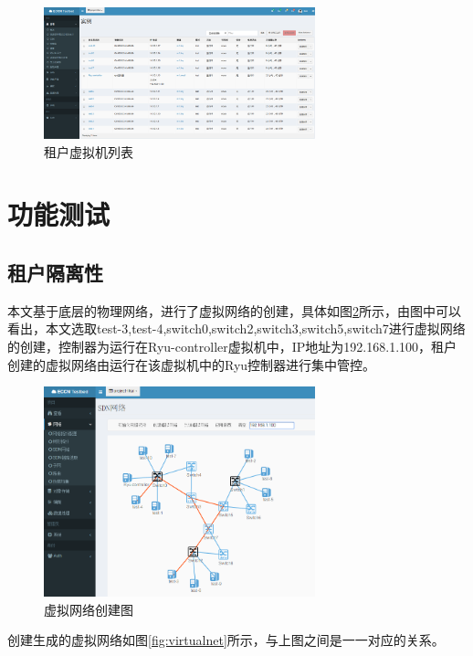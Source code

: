 \begin{figure}[!htb]
  \centering
  \includegraphics[width=0.7\textwidth]{logo/allhosts.png}
  \caption{租户虚拟机列表}
  \label{fig:allhosts}
\end{figure}
\section{功能测试}
\subsection{租户隔离性}
本文基于底层的物理网络，进行了虚拟网络的创建，具体如图\ref{fig:create-virtual}所示，由图中可以看出，本文选取test-3,test-4,switch0,switch2,switch3,switch5,switch7进行虚拟网络的创建，控制器为运行在Ryu-controller虚拟机中，IP地址为192.168.1.100，租户创建的虚拟网络由运行在该虚拟机中的Ryu控制器进行集中管控。

\begin{figure}[!htb]
  \centering
  \includegraphics[width=0.7\textwidth,height=0.50\textwidth]{logo/create-virtual.png}
  \caption{虚拟网络创建图}
  \label{fig:create-virtual}
\end{figure}

创建生成的虚拟网络如图\ref{fig:virtualnet}所示，与上图之间是一一对应的关系。

